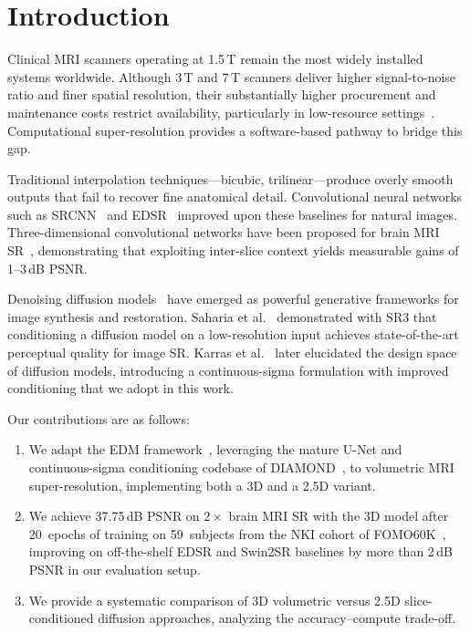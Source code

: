 \documentclass[10pt,journal]{IEEEtran}
\begin{document}
\section{Introduction}
\label{sec:introduction}

Clinical MRI scanners operating at 1.5\,T remain the most
widely installed systems worldwide.  Although 3\,T and 7\,T scanners
deliver higher signal-to-noise ratio and finer spatial resolution, their
substantially higher procurement and maintenance costs restrict
availability, particularly in low-resource settings~\cite{b11}.
Computational super-resolution provides a software-based pathway to
bridge this gap.

Traditional interpolation techniques---bicubic, trilinear---produce
overly smooth outputs that fail to recover fine anatomical detail.
Convolutional neural networks such as SRCNN~\cite{b9} and
EDSR~\cite{b10} improved upon these baselines for natural images.
Three-dimensional convolutional networks have been proposed for brain
MRI SR~\cite{b6,b7}, demonstrating that exploiting inter-slice context
yields measurable gains of 1--3\,dB PSNR.

Denoising diffusion models~\cite{b1} have emerged as powerful
generative frameworks for image synthesis and restoration.
Saharia et al.~\cite{b3} demonstrated with SR3 that conditioning a
diffusion model on a low-resolution input achieves state-of-the-art
perceptual quality for image SR.  Karras et al.~\cite{b18} later
elucidated the design space of diffusion models, introducing a
continuous-sigma formulation with improved conditioning that we adopt
in this work.

Our contributions are as follows:
\begin{enumerate}
  \item We adapt the EDM framework~\cite{b18}, leveraging the
        mature U-Net and continuous-sigma conditioning codebase of
        DIAMOND~\cite{b20}, to volumetric MRI super-resolution,
        implementing both a 3D and a 2.5D variant.
  \item We achieve 37.75\,dB PSNR on $2\times$ brain MRI SR
        with the 3D model after 20~epochs of training on
        59~subjects from the NKI cohort of FOMO60K~\cite{b19},
        improving on off-the-shelf EDSR and Swin2SR baselines by
        more than 2\,dB PSNR in our evaluation setup.
  \item We provide a systematic comparison of 3D volumetric versus
        2.5D slice-conditioned diffusion approaches, analyzing the
        accuracy--compute trade-off.
\end{enumerate}
\end{document}
